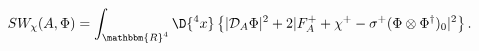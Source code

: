 \begin{equation}\label{pswa}
 SW_\chi(A,\Phi)=\int_{\mathbbm{R}^4}\D{ ^4x}\left\{
 |\mathcal{D}_A\Phi|^2+2|F^+_A+\chi^+-
  \sigma^+(\Phi\otimes\Phi^\dagger)_0|^2\right\}.
\end{equation}

